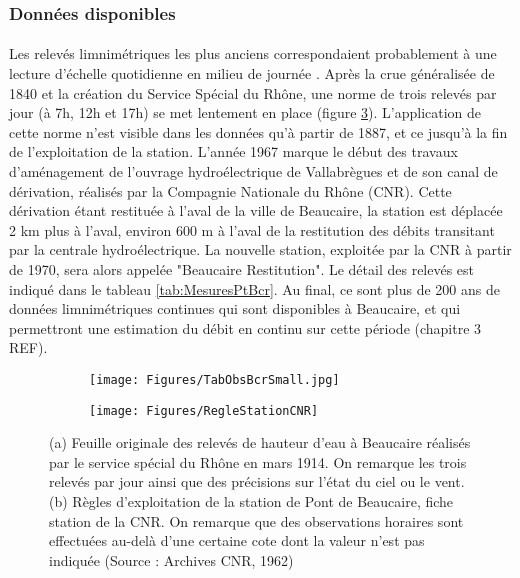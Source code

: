\documentclass[11pt]{article}
\begin{document}
\FloatBarrier

	\subsubsection{Données disponibles}
	\paragraph{} Les relevés limnimétriques les plus anciens correspondaient probablement à une lecture d'échelle quotidienne en milieu de journée \citep{pichard_hauteurs_2013}. Après la crue généralisée de 1840 et la création du Service Spécial du Rhône, une norme de trois relevés par jour (à 7h, 12h et 17h) se met lentement en place (figure \ref{fig:RelevesPt}). L'application de cette norme n'est visible dans les données qu'à partir de 1887, et ce jusqu'à la fin de l'exploitation de la station.  L'année 1967 marque le début des travaux d'aménagement de l'ouvrage hydroélectrique de Vallabrègues et de son canal de dérivation, réalisés par la Compagnie Nationale du Rhône (CNR). Cette dérivation étant restituée à l'aval de la ville de Beaucaire, la station est déplacée 2 km plus à l'aval, environ 600 m à l'aval de la restitution des débits transitant par la centrale hydroélectrique. La nouvelle station, exploitée par la CNR à partir de 1970, sera alors appelée "Beaucaire Restitution". Le détail des relevés est indiqué dans le tableau \ref{tab:MesuresPtBcr}. Au final, ce sont plus de 200 ans de données limnimétriques continues qui sont disponibles à Beaucaire, et qui permettront une estimation du débit en continu sur cette période (chapitre 3 REF). 
	
	\begin{figure}[h]
          \centering
            \begin{subfigure}{0.49\linewidth}
            \centering
            	\texttt{[image: Figures/TabObsBcrSmall.jpg]}\hfill
            	\caption{}
            	\label{subfig:TabObsPt}
            \end{subfigure}
            \begin{subfigure}{0.49\linewidth}
            \centering
            	\texttt{[image: Figures/RegleStationCNR]}
            	\caption{}
           		\label{subfig:RegleCNR}
            \end{subfigure}
      \caption{(a) Feuille originale des relevés de hauteur d'eau à Beaucaire réalisés par le service spécial du Rhône en mars 1914. On remarque les trois relevés par jour ainsi que des précisions sur l'état du ciel ou le vent. (b) Règles d'exploitation de la station de Pont de Beaucaire, fiche station de la CNR. On remarque que des observations horaires sont effectuées au-delà d'une certaine cote dont la valeur n'est pas indiquée (Source : Archives CNR, 1962)}
	 \label{fig:RelevesPt}
	\end{figure}            
            
\end{document}

